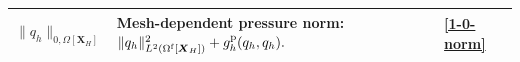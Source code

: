 \documentclass[11pt,reqno]{amsart}
\theoremstyle{definition}
\theoremstyle{plain}
\numberwithin{theorem}{section}
\numberwithin{proposition}{section}
\numberwithin{lemma}{section}
\numberwithin{equation}{section}
\newcommand{\bs}[1]{\boldsymbol{#1}}
\renewcommand{\(}{\bigl(}
\renewcommand{\)}{\bigr)}
\begin{document}
\begin{longtable}{
  |>{\raggedright\arraybackslash}p{\NotationColOne}
  |>{\raggedright\arraybackslash}p{\NotationColTwo}
  |>{\raggedright\arraybackslash}p{\NotationColThree}|}
$\|q_h\|_{0,\Omega[{\bs X}_H]}$
&
Mesh-dependent pressure norm:
$
\|q_h\|_{L^2(\Omega^{\rm f}[{\bs X}_H])}^2
+g_h^{\rm p}(q_h,q_h).
$
&
\eqref{1-0-norm}
\\
\hline














\end{longtable}
\end{document}
